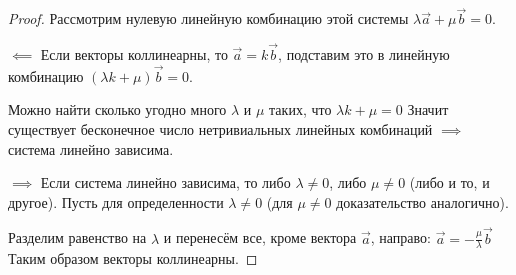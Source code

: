 \begin{proof}
  Рассмотрим нулевую линейную комбинацию этой системы \(\lambda \vec{a} + \mu
  \vec{b} = 0\).
  
  \(\impliedby\) Если векторы коллинеарны, то \(\vec{a} = k \vec{b}\), подставим
  это в линейную комбинацию \((\lambda k + \mu) \vec{b} = 0\).
  
  Можно найти сколько угодно много \(\lambda\) и \(\mu\) таких, что \(\lambda k
  + \mu = 0\) Значит существует бесконечное число нетривиальных линейных
  комбинаций \(\implies\) система линейно зависима.
  
  \(\implies\) Если система линейно зависима, то либо \(\lambda \ne 0\), либо
  \(\mu \ne 0\) (либо и то, и другое). Пусть для определенности \(\lambda \ne
  0\) (для \(\mu \ne 0\) доказательство аналогично).
  
  Разделим равенство на \(\lambda\) и перенесём все, кроме вектора \(\vec{a}\),
  направо: \(\vec{a} = -\frac{\mu}{\lambda} \vec{b}\) Таким образом векторы
  коллинеарны.
\end{proof}
